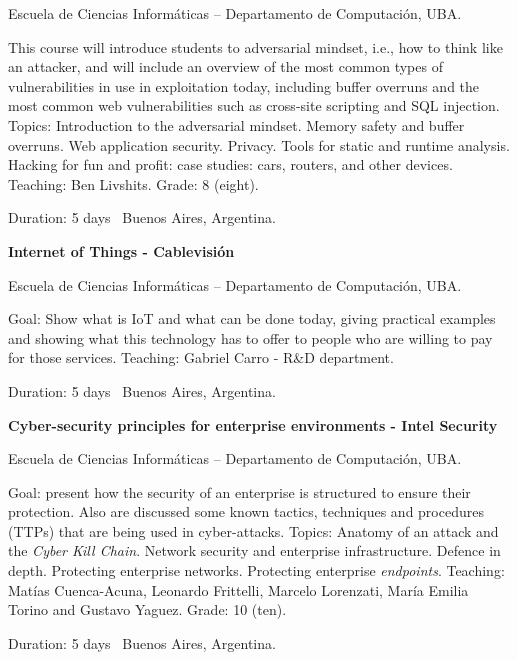 \documentclass[letterpaper,MMMyyyy,nonstop]{simpleresumecv}
\begin{document}
\begin{body}
\BulletItem Escuela de Ciencias Informáticas – Departamento de Computación, UBA.
\begin{detail}
	\SubBulletItem
	This course will introduce students to adversarial mindset, i.e., how to think like an attacker, and will include an overview of the most common types of vulnerabilities in use in exploitation today, including buffer overruns and the most common web vulnerabilities such as cross-site scripting and SQL injection.
	\SubBulletItem
	Topics: Introduction to the adversarial mindset. Memory safety and buffer overruns. Web application security. Privacy. Tools for static and runtime analysis. Hacking for fun and profit: case studies: cars, routers, and other devices.
	\SubBulletItem
	Teaching: Ben Livshits.
	\SubBulletItem
	Grade: 8 (eight).
\end{detail}
Duration: 5 days \SubBulletSymbol\, Buenos Aires, Argentina.

\BigGap
\textbf{Internet of Things - Cablevisión}
\hfill
{}

\BulletItem Escuela de Ciencias Informáticas – Departamento de Computación, UBA.
\begin{detail}
	\SubBulletItem
	Goal: Show what is IoT  and what can be done today, giving practical examples and showing what this technology has to offer to people who are willing to pay for those services.
	\SubBulletItem
	Teaching: Gabriel Carro - R\&D department.
\end{detail}
Duration: 5 days \SubBulletSymbol\, Buenos Aires, Argentina.

\BigGap
\textbf{Cyber-security principles for enterprise environments - Intel Security}
\hfill
{}

\BulletItem Escuela de Ciencias Informáticas – Departamento de Computación, UBA.
\begin{detail}
	\SubBulletItem
	Goal: present how the security of an enterprise is structured to ensure their protection. Also are discussed some known tactics, techniques and procedures (TTPs) that are being used in cyber-attacks.
	\SubBulletItem
	Topics: Anatomy of an attack and the \textit{Cyber Kill Chain}. Network security and enterprise infrastructure. Defence in depth. Protecting enterprise networks. Protecting enterprise \textit{endpoints}.
	\SubBulletItem
	Teaching: Matías Cuenca-Acuna, Leonardo Frittelli, Marcelo Lorenzati,  María  Emilia  Torino and Gustavo Yaguez.
	\SubBulletItem
	Grade: 10 (ten).
\end{detail}
Duration: 5 days \SubBulletSymbol\, Buenos Aires, Argentina.


\end{body}
\end{document}
